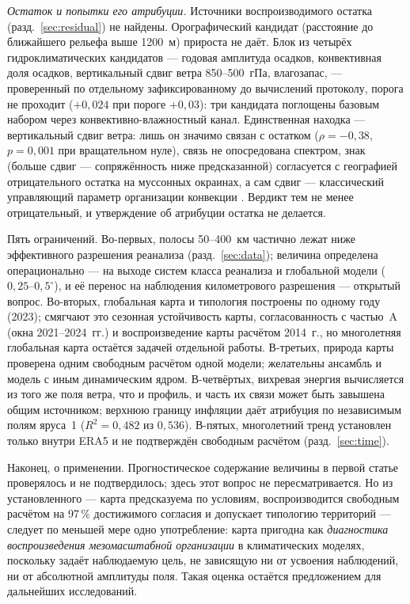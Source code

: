 \documentclass[11pt,a4paper]{article}
\begin{document}
\emph{Остаток и попытки его атрибуции.} Источники воспроизводимого остатка (разд.~\ref{sec:residual}) не найдены. Орографический кандидат (расстояние до ближайшего рельефа выше 1200~м) прироста не даёт. Блок из четырёх гидроклиматических кандидатов --- годовая амплитуда осадков, конвективная доля осадков, вертикальный сдвиг ветра 850--500~гПа, влагозапас, --- проверенный по отдельному зафиксированному до вычислений протоколу, порога не проходит ($+0{,}024$ при пороге $+0{,}03$): три кандидата поглощены базовым набором через конвективно-влажностный канал. Единственная находка --- вертикальный сдвиг ветра: лишь он значимо связан с остатком ($\rho=-0{,}38$, $p=0{,}001$ при вращательном нуле), связь не опосредована спектром, знак (больше сдвиг --- сопряжённость ниже предсказанной) согласуется с географией отрицательного остатка на муссонных окраинах, а сам сдвиг --- классический управляющий параметр организации конвекции \cite{RotunnoKlempWeisman1988,Wing2017}. Вердикт тем не менее отрицательный, и утверждение об атрибуции остатка не делается.

Пять ограничений. Во-первых, полосы 50--400~км частично лежат ниже эффективного разрешения реанализа (разд.~\ref{sec:data}); величина определена операционально --- на выходе систем класса реанализа и глобальной модели ($0{,}25$--$0{,}5^\circ$), и её перенос на наблюдения километрового разрешения --- открытый вопрос. Во-вторых, глобальная карта и типология построены по одному году (2023); смягчают это сезонная устойчивость карты, согласованность с частью~A (окна 2021--2024~гг.) и воспроизведение карты расчётом 2014~г., но многолетняя глобальная карта остаётся задачей отдельной работы. В-третьих, природа карты проверена одним свободным расчётом одной модели; желательны ансамбль и модель с иным динамическим ядром. В-четвёртых, вихревая энергия вычисляется из того же поля ветра, что и профиль, и часть их связи может быть завышена общим источником; верхнюю границу инфляции даёт атрибуция по независимым полям яруса~1 ($R^2=0{,}482$ из $0{,}536$). В-пятых, многолетний тренд установлен только внутри ERA5 и не подтверждён свободным расчётом (разд.~\ref{sec:time}).

Наконец, о применении. Прогностическое содержание величины в первой статье проверялось и не подтвердилось; здесь этот вопрос не пересматривается. Но из установленного --- карта предсказуема по условиям, воспроизводится свободным расчётом на 97\,\% достижимого согласия и допускает типологию территорий --- следует по меньшей мере одно употребление: карта пригодна как \emph{диагностика воспроизведения мезомасштабной организации} в климатических моделях, поскольку задаёт наблюдаемую цель, не зависящую ни от усвоения наблюдений, ни от абсолютной амплитуды поля. Такая оценка остаётся предложением для дальнейших исследований.
\end{document}
